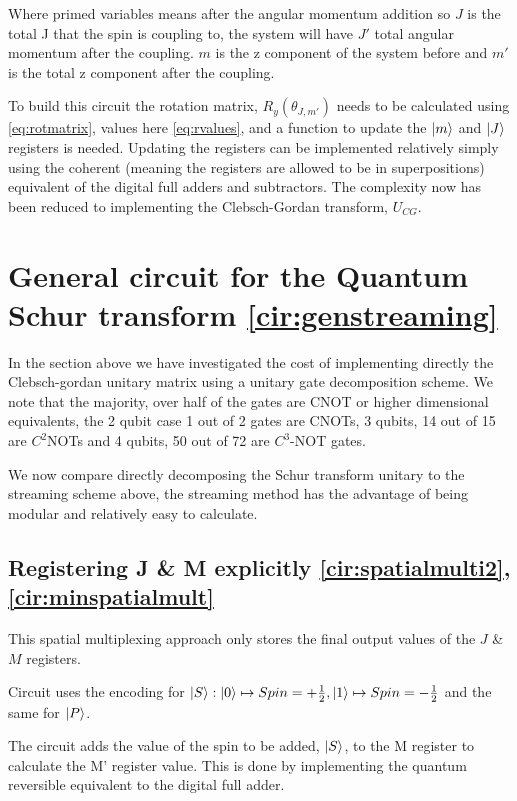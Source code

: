 \documentclass[12pt]{article}
\begin{document}
Where primed variables means after the angular momentum addition so $J$ is the total J that the spin is coupling to, the system will have $J'$ total angular momentum after the coupling. $m$ is the z component of the system before and $m'$ is the total z component after the coupling.

To build this circuit the rotation matrix, $R_y(\theta_{J,m'})$ needs to be calculated using \autoref{eq:rotmatrix}, values here \autoref{eq:rvalues}, and a function to update the $\left\vert{m}\right\rangle$ and $\left\vert{J}\right\rangle$ registers is needed. Updating the registers can be implemented relatively simply using the coherent (meaning the registers are allowed to be in superpositions) equivalent of the digital full adders and subtractors. The complexity now has been reduced to implementing the Clebsch-Gordan transform, $U_{CG}$.

\section{General circuit for the Quantum Schur transform \autoref{cir:genstreaming}}

In the section above we have investigated the cost of implementing directly the Clebsch-gordan unitary matrix using a unitary gate decomposition scheme. We note that the majority, over half of the gates are CNOT or higher dimensional equivalents, the 2 qubit case 1 out of 2 gates are CNOTs, 3 qubits, 14 out of 15 are $C^2$NOTs and 4 qubits, 50 out of 72 are $C^3$-NOT gates. 

We now compare directly decomposing the Schur transform unitary to the streaming scheme above, the streaming method has the advantage of being modular and relatively easy to calculate.  

\subsection{Registering J \& M explicitly \autoref{cir:spatialmulti2}, \autoref{cir:minspatialmult}}

This spatial multiplexing approach only stores the final output values of the $J$ \& $M$ registers. 

Circuit uses the encoding for $\left\vert{S}\right\rangle : \left\vert{0}\right\rangle \mapsto Spin = +\frac{1}{2}, \left\vert{1}\right\rangle \mapsto Spin = -\frac{1}{2}$ and the same for $\left\vert{P}\right\rangle$. 

The circuit adds the value of the spin to be added, $\left\vert{S}\right\rangle$, to the M register to calculate the M' register value. This is done by implementing the quantum reversible equivalent to the digital full adder. 
\end{document}
